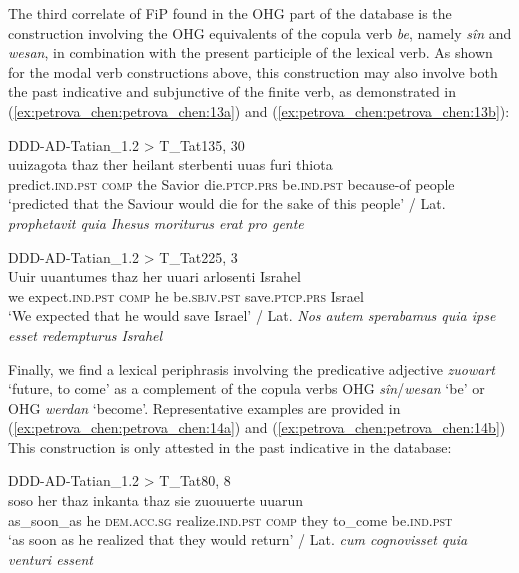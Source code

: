 \documentclass[output=paper,colorlinks,citecolor=brown]{langscibook}
\begin{document}
The third correlate of FiP found in the OHG part of the database is the construction involving the OHG equivalents of the copula verb \textit{be}, namely \textit{sîn} and \textit{wesan}, in combination with the present participle of the lexical verb. As shown for the modal verb constructions above, this construction may also involve both the past indicative and subjunctive of the finite verb, as demonstrated in (\ref{ex:petrova_chen:petrova_chen:13a}) and (\ref{ex:petrova_chen:petrova_chen:13b}):

\ea\label{ex:petrova_chen:petrova_chen:13}
\ea \label{ex:petrova_chen:petrova_chen:13a} DDD-AD-Tatian\_1.2 > T\_Tat135, 30\\
\gll uuizagota thaz ther heilant sterbenti uuas furi thiota\\
predict.\textsc{ind.pst} \textsc{comp} the Savior die.\textsc{ptcp.prs} be.\textsc{ind.pst} because-of people\\
\glt ‘predicted that the Saviour would die for the sake of this people’ / Lat. \textit{prophetavit quia Ihesus moriturus erat pro gente}

\ex \label{ex:petrova_chen:petrova_chen:13b} DDD-AD-Tatian\_1.2 > T\_Tat225, 3\\
\gll Uuir uuantumes thaz her uuari arlosenti Israhel\\
we expect.\textsc{ind.pst} \textsc{comp} he be.\textsc{sbjv.pst} save.\textsc{ptcp.prs} Israel\\
\glt ‘We expected that he would save Israel’ / Lat. \textit{Nos autem sperabamus quia ipse esset redempturus Israhel}
\z
\z

Finally, we find a lexical periphrasis involving the predicative adjective \textit{zuowart} ‘future, to come’ as a complement of the copula verbs OHG \textit{sîn}/\textit{wesan} ‘be’ or OHG \textit{werdan} ‘become’. Representative examples are provided in (\ref{ex:petrova_chen:petrova_chen:14a}) and (\ref{ex:petrova_chen:petrova_chen:14b}) This construction is only attested in the past indicative in the database:

\ea 
\ea\label{ex:petrova_chen:petrova_chen:14a} DDD-AD-Tatian\_1.2 > T\_Tat80, 8\\
\gll soso her thaz inkanta thaz sie zuouuerte uuarun\\
as\_soon\_as he \textsc{dem.acc.sg} realize.\textsc{ind.pst} \textsc{comp} they to\_come be.\textsc{ind.pst}\\
\glt ‘as soon as he realized that they would return’ / Lat. \textit{cum cognovisset quia venturi essent}
\end{document}
